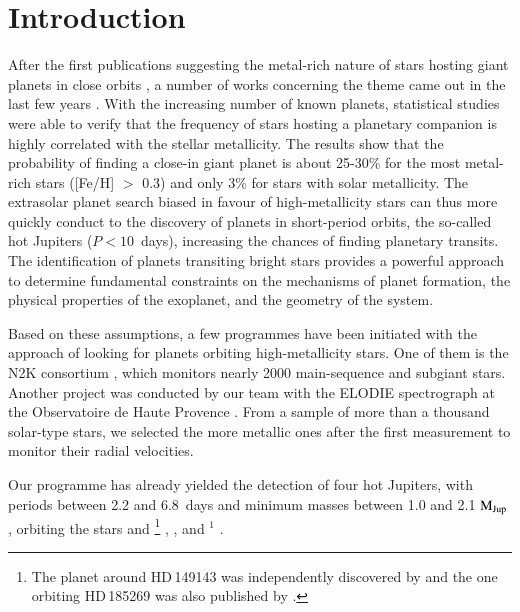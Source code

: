 \documentclass{aa}
\begin{document}
\maketitle
\section{Introduction}
After the first publications suggesting the metal-rich nature of stars
hosting giant planets in close orbits \citep{Gonzalez1997,Gonzalez1998},
a number of works concerning the theme came out in the last few years
\citep{Santosetal2001,Santosetal2004,FischerValenti2005,Gonzalez2006}. With
the increasing number of known planets, statistical studies were able to
verify that the frequency of stars hosting a planetary companion is highly
correlated with the stellar metallicity. The results show that the
probability of finding a close-in giant planet is about 25-30\% for the most
metal-rich stars ([Fe/H] $>$ 0.3) and only 3\% for stars with solar
metallicity. The extrasolar planet search biased in favour of
high-metallicity stars can thus more quickly conduct to the discovery of
planets in short-period orbits, the so-called hot Jupiters ($P < 10$~days),
increasing the chances of finding planetary transits. The identification of
planets transiting bright stars provides a powerful approach to determine
fundamental constraints on the mechanisms of planet formation, the physical
properties of the exoplanet, and the geometry of the system.

Based on these assumptions, a few programmes have been initiated with the
approach of looking for planets orbiting high-metallicity stars. One of them
is the N2K consortium \citep{Fischeretal2004}, which monitors nearly 2000
main-sequence and subgiant stars. Another project was conducted by our team
with the ELODIE spectrograph at the Observatoire de Haute Provence
\citep{DaSilvaetal2006}. From a sample of more than a thousand solar-type
stars, we selected the more metallic ones after the first measurement to
monitor their radial velocities.

Our programme has already yielded the detection of four hot Jupiters, with
periods between 2.2 and 6.8~days and minimum masses between 1.0 and 2.1
${\rm M_{Jup}}$, orbiting the stars  and
\footnote{The planet around HD\,149143 was independently
discovered by \citet{Fischeretal2006} and the one orbiting HD\,185269 was
also published by \citet{Johnsonetal2006}.} \citep{DaSilvaetal2006},
 \citep{Bouchyetal2005}, and $^1$
\citep{Moutouetal2006}.
\end{document}
